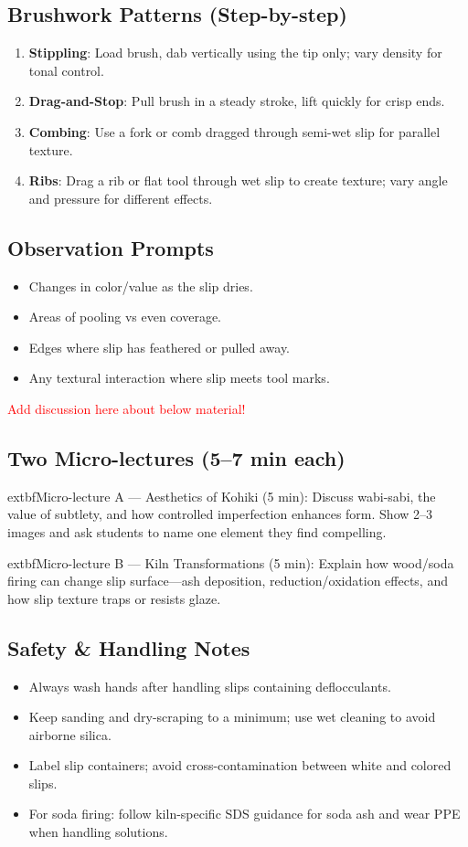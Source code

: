 \documentclass[12pt]{scrartcl}
\begin{document}
\subsection*{Brushwork Patterns (Step-by-step)}
\begin{enumerate}
  \item \textbf{Stippling}: Load brush, dab vertically using the tip only; vary density for tonal control.
  \item \textbf{Drag-and-Stop}: Pull brush in a steady stroke, lift quickly for crisp ends.
  \item \textbf{Combing}: Use a fork or comb dragged through semi-wet slip for parallel texture.
  \item \textbf{Ribs}: Drag a rib or flat tool through wet slip to create texture; vary angle and pressure for different effects.
\end{enumerate}

\subsection*{Observation Prompts}
\begin{itemize}
  \item Changes in color/value as the slip dries.
  \item Areas of pooling vs even coverage.
  \item Edges where slip has feathered or pulled away.
  \item Any textural interaction where slip meets tool marks.
\end{itemize}

\textcolor{red}{Add discussion here about below material!}

\subsection*{Two Micro-lectures (5--7 min each)}
	extbf{Micro-lecture A — Aesthetics of Kohiki (5 min)}: Discuss wabi-sabi, the value of subtlety, and how controlled imperfection enhances form. Show 2--3 images and ask students to name one element they find compelling.

	extbf{Micro-lecture B — Kiln Transformations (5 min)}: Explain how wood/soda firing can change slip surface—ash deposition, reduction/oxidation effects, and how slip texture traps or resists glaze.

\subsection*{Safety \& Handling Notes}
\begin{itemize}
  \item Always wash hands after handling slips containing deflocculants.
  \item Keep sanding and dry-scraping to a minimum; use wet cleaning to avoid airborne silica.
  \item Label slip containers; avoid cross-contamination between white and colored slips.
  \item For soda firing: follow kiln-specific SDS guidance for soda ash and wear PPE when handling solutions.
\end{itemize}
\end{document}
